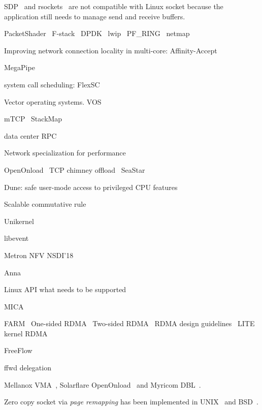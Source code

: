 SDP~\cite{socketsdirect} and rsockets~\cite{rsockets} are not compatible with Linux socket because the application still needs to manage send and receive buffers.



PacketShader~\cite{han2010packetshader}
F-stack~\cite{fstack}
DPDK~\cite{dpdk} lwip~\cite{dunkels2001design}
PF\_RING~\cite{pf-ring}
netmap~\cite{rizzo2012netmap}

Improving network connection locality in multi-core:
Affinity-Accept~\cite{pesterev2012improving}


MegaPipe~\cite{han2012megapipe}

system call scheduling:
FlexSC~\cite{soares2010flexsc}

Vector operating systems.
VOS~\cite{vasudevan2011case}

mTCP~\cite{jeong2014mtcp}
StackMap~\cite{yasukata2016stackmap}

data center RPC~\cite{stuedi2014darpc}

Network specialization for performance~\cite{marinos2014network}

OpenOnload~\cite{openonload}
TCP chimney offload~\cite{networking2004network}
SeaStar~\cite{seastar}

Dune: safe user-mode access to privileged CPU features~\cite{belay2012dune}

Scalable commutative rule~\cite{clements2015scalable}

Unikernel~\cite{madhavapeddy2013unikernels}

libevent~\cite{libevent}

Metron NFV NSDI'18~\cite{metron2018nsdi}

Anna~\cite{anna}

Linux API what needs to be supported~\cite{tsai2016study}

MICA~\cite{lim2014mica}

FARM~\cite{dragojevic2014farm}
One-sided RDMA~\cite{mitchell2013using}
Two-sided RDMA~\cite{kalia2014using}
RDMA design guidelines~\cite{kaminsky2016design}
LITE kernel RDMA~\cite{tsai2017lite}

FreeFlow~\cite{freeflow}


ffwd delegation~\cite{roghanchi2017ffwd}

Mellanox VMA~\cite{libvma}, Solarflare OpenOnload~\cite{openonload} and Myricom DBL~\cite{dbl}.

Zero copy socket via \textit{page remapping} has been implemented in UNIX~\cite{thadani1995efficient} and BSD~\cite{chu1996zero}. 

